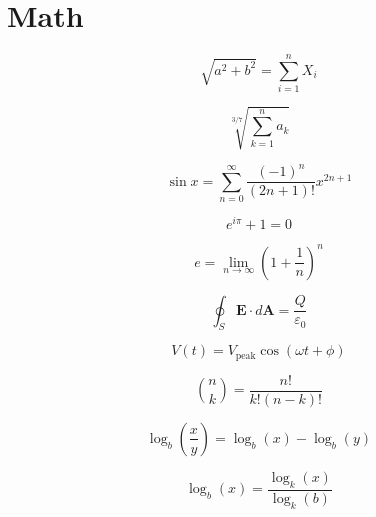 \chapter{Math}

\begin{equation}
  \sqrt{a^2 + b^2} = \sum_{i=1}^{n} X_i
\end{equation}

\begin{equation}
  \sqrt[3/7]{\sum_{k=1}^{n} a_k}
\end{equation}

\begin{equation}
  \sin x = \sum_{n=0}^{\infty} \frac{(-1)^n}{(2n+1)!} x^{2n+1}
\end{equation}

\begin{equation}
  e^{i\pi} + 1 = 0
\end{equation}

\begin{equation}
  e = \lim_{n \to \infty} \left( 1 + \frac{1}{n} \right)^n
\end{equation}

\begin{equation}
  \oint_S \mathbf{E} \cdot d\mathbf{A} = \frac{Q}{\varepsilon_0}
\end{equation}

\begin{equation}
  V(t) = V_{\text{peak}} \cos(\omega t + \phi)
\end{equation}

\begin{equation}
  \binom{n}{k} = \frac{n!}{k!(n-k)!}
\end{equation}

\begin{equation}
  \log_b\left(\frac{x}{y}\right) = \log_b(x) - \log_b(y)
\end{equation}

\begin{equation}
  \log_b(x) = \frac{\log_k(x)}{\log_k(b)}
\end{equation}
